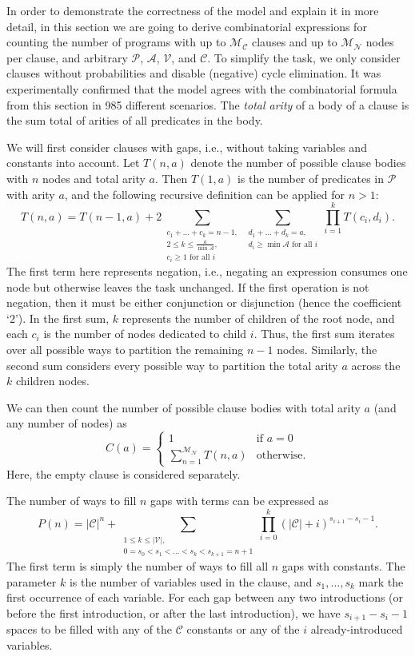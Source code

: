 \documentclass[runningheads]{llncs}
\newcommand{\predicates}{\mathcal{P}}
\newcommand{\variables}{\mathcal{V}}
\newcommand{\constants}{\mathcal{C}}
\newcommand{\arities}{\mathcal{A}}
\newcommand{\maxNumNodes}{\mathcal{M}_{\mathcal{N}}}
\newcommand{\maxNumClauses}{\mathcal{M}_{\mathcal{C}}}
\begin{document}
In order to demonstrate the correctness of the model and explain it in more
detail, in this section we are going to derive combinatorial expressions for
counting the number of programs with up to $\maxNumClauses{}$ clauses and up to
$\maxNumNodes{}$ nodes per clause, and arbitrary $\predicates{}$,
$\arities{}$, $\variables{}$, and $\constants{}$. To simplify the task, we only
consider clauses without probabilities and disable (negative) cycle elimination.
It was experimentally confirmed that the model agrees with the combinatorial
formula from this section in 985 different scenarios. The \emph{total arity} of
a body of a clause is the sum total of arities of all predicates in the body.

We will first consider clauses with gaps, i.e., without taking variables and
constants into account. Let $T(n, a)$ denote the number of possible clause
bodies with $n$ nodes and total arity $a$. Then $T(1, a)$ is the number of
predicates in $\predicates{}$ with arity $a$, and the following recursive
definition can be applied for $n > 1$:
\[
  T(n, a) = T(n-1, a) + 2\sum_{\substack{c_1 + \dots + c_k = n - 1,\\
      2 \le k \le \frac{a}{\min \arities{}},\\
      c_i \ge 1 \text{ for all } i}} \sum_{\substack{d_1 + \dots + d_k = a,\\
    d_i \ge \min \arities{} \text{ for all } i}} \prod_{i=1}^k T(c_i, d_i).
\]
The first term here represents negation, i.e., negating an expression consumes
one node but otherwise leaves the task unchanged. If the first operation is not
negation, then it must be either conjunction or disjunction (hence the
coefficient `2'). In the first sum, $k$ represents the number of children of the
root node, and each $c_i$ is the number of nodes dedicated to child $i$. Thus,
the first sum iterates over all possible ways to partition the remaining $n-1$
nodes. Similarly, the second sum considers every possible way to partition the
total arity $a$ across the $k$ children nodes.

We can then count the number of possible clause bodies with total arity $a$ (and
any number of nodes) as
\[
  C(a) = \begin{cases}
    1 & \text{if } a = 0\\
    \sum_{n=1}^{\maxNumNodes{}} T(n, a) & \text{otherwise.}
  \end{cases}
\]
Here, the empty clause is considered separately.

The number of ways to fill $n$ gaps with terms can be expressed as
\[
  P(n) = |\constants{}|^n + \sum_{\substack{1 \le k \le |\variables{}|, \\ 0 =
      s_0 < s_1 < \dots < s_k < s_{k+1} = n+1}} \prod_{i=0}^k (|\constants{}| +
  i)^{s_{i+1} - s_i - 1}.
\]
The first term is simply the number of ways to fill all $n$ gaps with
constants. The parameter $k$ is the number of variables used in the clause, and
$s_1, \dots, s_k$ mark the first occurrence of each variable. For each gap
between any two introductions (or before the first introduction, or after the last
introduction), we have $s_{i+1}-s_i-1$ spaces to be filled with any of the
$\constants{}$ constants or any of the $i$ already-introduced variables.
\end{document}
